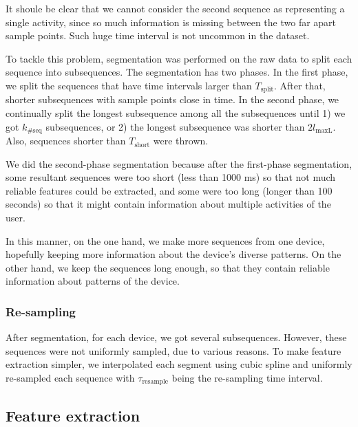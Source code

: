 \documentclass{article} %
\begin{document}
It shoule be clear that we cannot consider the second sequence as representing a single activity, since so much information is missing between the two far apart sample points. Such huge time interval is not uncommon in the dataset. %

To tackle this problem, segmentation was performed on the raw data to split each sequence into subsequences. The segmentation has two phases. In the first phase, we split the sequences that have time intervals larger than $T_\mathrm{split}$. After that, shorter subsequences with sample points close in time. In the second phase, we continually split the longest subsequence among all the subsequences until 1) we got $k_\mathrm{\#seq}$ subsequences, or 2) the longest subsequence was shorter than $2 l_\mathrm{maxL}$. Also, sequences shorter than $T_\mathrm{short}$ were thrown.

We did the second-phase segmentation because after the first-phase segmentation, some resultant sequences were too short (less than 1000 ms) so that not much reliable features could be extracted, and some were too long (longer than 100 seconds) so that it might contain information about multiple activities of the user. 

In this manner, on the one hand, we make more sequences from one device, hopefully keeping more information about the device's diverse patterns. On the other hand, we keep the sequences long enough, so that they contain reliable information about patterns of the device.

\subsubsection{Re-sampling} 
After segmentation, for each device, we got several subsequences. However, these sequences were not uniformly sampled, due to various reasons. To make feature extraction simpler, we interpolated each segment using cubic spline and uniformly re-sampled each sequence with  $\tau_\mathrm{resample}$ being the re-sampling time interval.

\subsection{Feature extraction}
\label{feautures}
\end{document}
